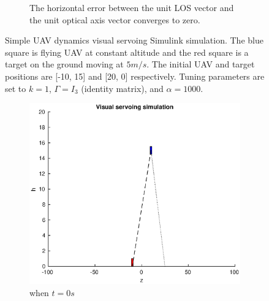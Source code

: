 \begin{figure}[htbp]
\begin{subfigure}[t]{0.8\linewidth}
		\caption{The horizontal error between the unit LOS vector and the unit optical axis vector converges to zero.}
	\end{subfigure}	
	\caption{Simple UAV dynamics visual servoing Simulink simulation. The blue square is flying UAV at constant altitude and the red square is a target on the ground moving at $5m/s$. The initial UAV and target positions are [-10, 15] and [20, 0] respectively. Tuning parameters are set to $k=1$, $\Gamma=I_3$ (identity matrix), and $\alpha=1000$.}
	\label{simple_simulation}
\end{figure}

\begin{figure}[htbp]
	\centering
	\begin{subfigure}[t]{0.45\linewidth}
		\includegraphics[width=\textwidth]{images/chapter4/another_simple_zero}
		\caption{when $t=0s$}
	\end{subfigure}
	~ %
	\begin{subfigure}[t]{0.45\linewidth}

\end{subfigure}
\end{figure}
